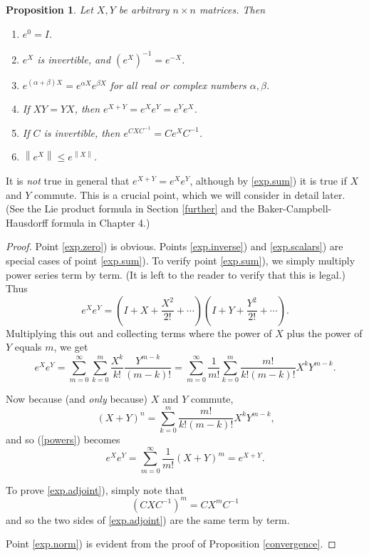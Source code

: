 \documentclass{amsbook}
\theoremstyle{plain}
\newtheorem{proposition}[theorem]{Proposition}
\numberwithin{equation}{chapter}
\numberwithin{theorem}{chapter}
\begin{document}
\begin{proposition}
\label{exp.properties}Let $X,Y$ be arbitrary $n\times n$ matrices. Then

\begin{enumerate}
\item \label{exp.zero}$e^{0}=I$.

\item \label{exp.inverse}$e^{X}$ is invertible, and $\left(  e^{X}\right)
^{-1}=e^{-X}$.

\item \label{exp.scalars}$e^{(\alpha+\beta)X}=e^{\alpha X}e^{\beta X}$ for all
real or complex numbers $\alpha,\beta$.

\item \label{exp.sum}If $XY=YX$, then $e^{X+Y}=e^{X}e^{Y}=e^{Y}e^{X}$.

\item \label{exp.adjoint}If $C$ is invertible, then $e^{CXC^{-1}}=Ce^{X}%
C^{-1}$.

\item \label{exp.norm}$\left\|  e^{X}\right\|  \leq e^{\left\|  X\right\|  }$.
\end{enumerate}
\end{proposition}

It is \textit{not} true in general that $e^{X+Y}=e^{X}e^{Y}$, although by
\ref{exp.sum}) it is true if $X$ and $Y$ commute. This is a crucial point,
which we will consider in detail later. (See the Lie product formula in
Section \ref{further} and the Baker-Campbell-Hausdorff formula in Chapter 4.)

\begin{proof}
Point \ref{exp.zero}) is obvious. Points \ref{exp.inverse}) and
\ref{exp.scalars}) are special cases of point \ref{exp.sum}). To verify point
\ref{exp.sum}), we simply multiply power series term by term. (It is left to
the reader to verify that this is legal.) Thus
\[
e^{X}e^{Y}=\left(  I+X+\frac{X^{2}}{2!}+\cdots\right)  \left(  I+Y+\frac
{Y^{2}}{2!}+\cdots\right)  \text{.}%
\]
Multiplying this out and collecting terms where the power of $X$ plus the
power of $Y$ equals $m$, we get
\begin{equation}
e^{X}e^{Y}=\sum_{m=0}^{\infty}\sum_{k=0}^{m}\frac{X^{k}}{k!}\frac{Y^{m-k}%
}{(m-k)!}=\sum_{m=0}^{\infty}\frac{1}{m!}\sum_{k=0}^{m}\frac{m!}%
{k!(m-k)!}X^{k}Y^{m-k}\text{.}\label{powers}%
\end{equation}

Now because (and \textit{only} because) $X$ and $Y$ commute,
\[
(X+Y)^{n}=\sum_{k=0}^{m}\frac{m!}{k!(m-k)!}X^{k}Y^{m-k}\text{,}%
\]
and so (\ref{powers}) becomes
\[
e^{X}e^{Y}=\sum_{m=0}^{\infty}\frac{1}{m!}(X+Y)^{m}=e^{X+Y}\text{.}%
\]

To prove \ref{exp.adjoint}), simply note that
\[
\left(  CXC^{-1}\right)  ^{m}=CX^{m}C^{-1}%
\]
and so the two sides of \ref{exp.adjoint}) are the same term by term.

Point \ref{exp.norm}) is evident from the proof of Proposition
\ref{convergence}.
\end{proof}
\end{document}
